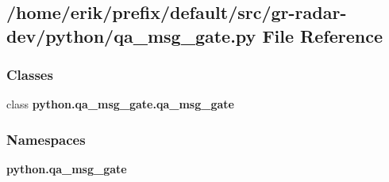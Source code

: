 \subsection{/home/erik/prefix/default/src/gr-\/radar-\/dev/python/qa\+\_\+msg\+\_\+gate.py File Reference}
\label{qa__msg__gate_8py}
\subsubsection*{Classes}
\begin{DoxyCompactItemize}
\item 
class {\bf python.\+qa\+\_\+msg\+\_\+gate.\+qa\+\_\+msg\+\_\+gate}
\end{DoxyCompactItemize}
\subsubsection*{Namespaces}
\begin{DoxyCompactItemize}
\item 
 {\bf python.\+qa\+\_\+msg\+\_\+gate}
\end{DoxyCompactItemize}
